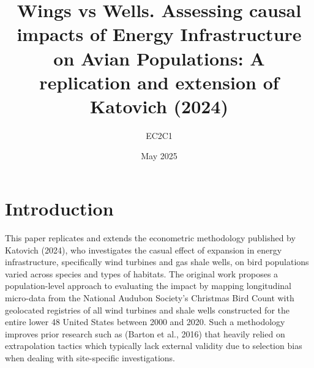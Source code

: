 \documentclass{article}
\title{Wings vs Wells. Assessing causal impacts of Energy Infrastructure on Avian Populations: A replication and extension of Katovich (2024)}
\author{EC2C1}
\date{May 2025}
\begin{document}
\maketitle

\section{Introduction}

This paper replicates and extends the econometric methodology published by Katovich (2024), who investigates the casual effect of expansion in energy infrastructure, specifically wind turbines and gas shale wells, on bird populations varied across species and types of habitats. The original work proposes a population-level approach to evaluating the impact by mapping longitudinal micro-data from the National Audubon Society’s Christmas Bird Count with geolocated registries of all wind turbines and shale wells constructed for the entire lower 48 United States between 2000 and 2020. Such a methodology improves prior research such as (Barton et al., 2016) that heavily relied on extrapolation tactics which typically lack external validity due to selection bias when dealing with site-specific investigations.
 
\addlinespace
\end{document}

